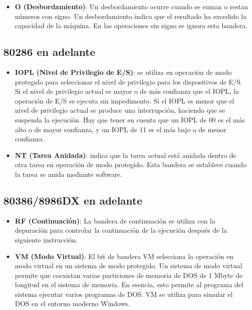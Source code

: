 \begin{itemize}
		\item \textbf{O (Desbordamiento)}: Un desbordamiento ocurre cuando se suman o restan
			números con signo. Un desbordamiento indica que el resultado ha excedido la
			capacidad de la máquina. En las operaciones sin signo se ignora esta bandera.
	\end{itemize}

	\subsection{80286 en adelante}

	\begin{itemize}
		\item \textbf{IOPL (Nivel de Privilegio de E/S)}: se utiliza en operación de modo protegido
			para seleccionar el nivel de privilegio para los dispositivos de E/S. Si el
			nivel de privilegio actual es mayor o de más confianza que el IOPL, la operación
			de E/S se ejecuta sin impedimento. Si el IOPL es menor que el nivel de
			privilegio actual se produce una interrupción, haciendo que se suspenda la ejecución.
			Hay que tener en cuenta que un IOPL de 00 es el más alto o de mayor confianza,
			y un IOPL de 11 es el más bajo o de menor confianza.

		\item \textbf{NT (Tarea Anidada)}: indica que la tarea actual está anidada dentro de
			otra tarea en operación de modo protegido. Esta bandera se establece cuando la
			tarea se anida mediante software.
	\end{itemize}

	\subsection{80386/8986DX en adelante}

	\begin{itemize}
		\item \textbf{RF (Continuación)}: La bandera de continuación se utiliza con la depuración
			para controlar la continuación de la ejecución después de la siguiente instrucción.

		\item \textbf{VM (Modo Virtual)}: El bit de bandera VM selecciona la operación en modo
			virtual en un sistema de modo protegido. Un sistema de modo virtual permite
			que coexistan varias particiones de memoria de DOS de 1 Mbyte de longitud en
			el sistema de memoria. En esencia, esto permite al programa del sistema
			ejecutar varios programas de DOS. VM se utiliza para simular el DOS en el entorno
			moderno Windows.
	\end{itemize}

